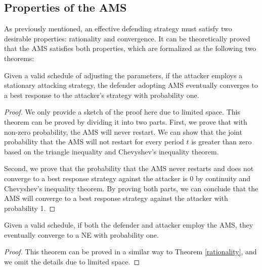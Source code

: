 \subsection{Properties of the AMS}

As previously mentioned, an effective defending strategy must satisfy two desirable properties: rationality and convergence. It can be theoretically proved that the AMS satisfies both properties, which are formalized as the following two theorems: 

\begin{theorem}
\label{rationality}
Given a valid schedule of adjusting the parameters, if the attacker employs a stationary attacking strategy, the defender adopting AMS eventually converges to a best response to the attacker's strategy with probability one.
\begin{proof}
We only provide a sketch of the proof here due to limited space. This theorem can be proved by dividing it into two parts. First, we prove that with non-zero probability, the AMS will never restart. We can show that the joint probability that the AMS will not restart for every period $t$ is greater than zero based on the triangle inequality and Chevyshev's inequality theorem. 

Second, we prove that the probability that the AMS never restarts and does not converge to a best response strategy against the attacker is 0 by continuity and Chevyshev's inequality theorem.  By proving both parts, we can conclude that the AMS will converge to a best response strategy against the attacker with probability 1.
\end{proof}
\end{theorem}

\begin{theorem}
\label{convergence}
Given a valid schedule, if both the defender and attacker employ the AMS, they eventually converge to a NE with probability one.
\begin{proof}
This theorem can be proved in a similar way to Theorem \ref{rationality}, and we omit the details due to limited space.
\end{proof}
\end{theorem}